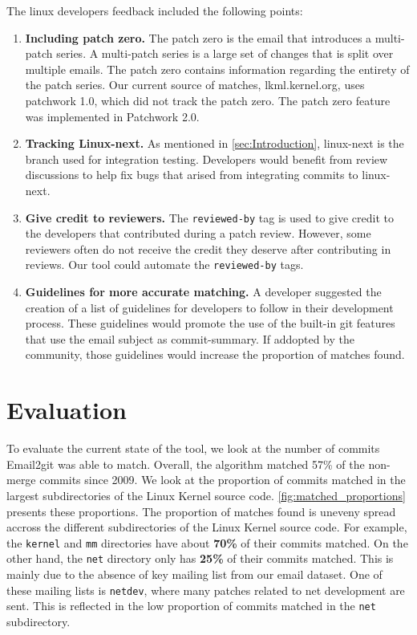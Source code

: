 The linux developers feedback included the following points:
\begin{enumerate}
	\item \textbf{Including patch zero.} The patch zero is the email that introduces a multi-patch series. A multi-patch series is a large set of changes that is split over multiple emails. The patch zero contains information regarding the entirety of the patch series. Our current source of matches, lkml.kernel.org, uses patchwork 1.0, which did not track the patch zero. The patch zero feature was implemented in Patchwork 2.0.

	\item \textbf{Tracking Linux-next.} As mentioned in \autoref{sec:Introduction}, linux-next is the branch used for integration testing. Developers would benefit from review discussions to help fix bugs that arised from integrating commits to linux-next. 

	\item \textbf{Give credit to reviewers.} The \texttt{reviewed-by} tag is used to give credit to the developers that contributed during a patch review. However, some reviewers often do not receive the credit they deserve after contributing in reviews. Our tool could automate the \texttt{reviewed-by} tags.

	\item \textbf{Guidelines for more accurate matching.} A developer suggested the creation of a list of guidelines for developers to follow in their development process. These guidelines would promote the use of the built-in git features that use the email subject as commit-summary. If addopted by the community, those guidelines would increase the proportion of matches found. 
\end{enumerate}


\section{Evaluation}

To evaluate the current state of the tool, we look at the number of commits Email2git was able to match. Overall, the algorithm matched 57\% of the non-merge commits since 2009. We look at the proportion of commits matched in the largest subdirectories of the Linux Kernel source code. \autoref{fig:matched_proportions} presents these proportions. The proportion of matches found is uneveny spread accross the different subdirectories of the Linux Kernel source code. For example, the \texttt{kernel} and \texttt{mm} directories have about \textbf{70\%} of their commits matched. On the other hand, the \texttt{net} directory only has \textbf{25\%} of their commits matched. This is mainly due to the absence of key mailing list from our email dataset. One of these mailing lists is \texttt{netdev}, where many patches related to net development are sent. This is reflected in the low proportion of commits matched in the \texttt{net} subdirectory. 


